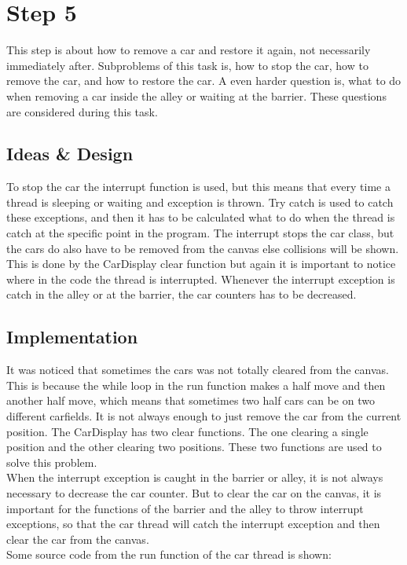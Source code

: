 \section{Step 5}
This step is about how to remove a car and restore it again, not necessarily immediately after. Subproblems of this task is, how to stop the car, how to remove the car, and how to restore the car. A even harder question is, what to do when removing a car inside the alley or waiting at the barrier. These questions are considered during this task.

\subsection{Ideas \& Design}
To stop the car the interrupt function is used, but this means that every time a thread is sleeping or waiting and exception is thrown. Try catch is used to catch these exceptions, and then it has to be calculated what to do when the thread is catch at the specific point in the program. The interrupt stops the car class, but the cars do also have to be removed from the canvas else collisions will be shown. This is done by the CarDisplay clear function but again it is important to notice where in the code the thread is interrupted. Whenever the interrupt exception is catch in the alley or at the barrier, the car counters has to be decreased.

\subsection{Implementation}
It was noticed that sometimes the cars was not totally cleared from the canvas. This is because the while loop in the run function makes a half move and then another half move, which means that sometimes two half cars can be on two different carfields. It is not always enough to just remove the car from the current position. The CarDisplay has two clear functions. The one clearing a single position and the other clearing two positions. These two functions are used to solve this problem.
\\

When the interrupt exception is caught in the barrier or alley, it is not always necessary to decrease the car counter. But to clear the car on the canvas, it is important for the functions of the barrier and the alley to throw interrupt exceptions, so that the car thread will catch the interrupt exception and then clear the car from the canvas. \\
Some source code from the run function of the car thread is shown:

